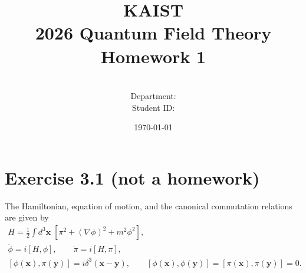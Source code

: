 \documentclass[a4paper,11pt]{article}
\title{KAIST\\2026 Quantum Field Theory\\
Homework 1\bigskip}
\author{\textbf{\Large \name} \\
Department: \department\\
Student ID: \studentid}
\date{\today}
\begin{document}
\thispagestyle{empty}
\maketitle
\tableofcontents
{}
\setcounter{secnumdepth}{1}
\setcounter{tocdepth}{2}

\newcommand{\tr}{\operatorname{tr}}
\newcommand{\sgn}{\operatorname{sgn}}
\newcommand{\supp}{\operatorname{supp}}
\renewcommand{\Re}{\operatorname{Re}}
\renewcommand{\Im}{\operatorname{Im}}
\newcommand{\boltz}{k_{\mathrm{B}}}

\section{Exercise 3.1 (not a homework)}

The Hamiltonian, equation of motion, and the canonical commutation relations are given by
\begin{gather}
    H = \frac{1}{2}\int d^3\mathbf{x}\;\left[\pi^2 + (\nabla\phi)^2 + m^2\phi^2\right],\\
    \dot{\phi} = i[H, \phi], \qquad\dot{\pi}=i[H,\pi],\\
    [\phi(\mathbf{x}), \pi(\mathbf{y})] = i\delta^3(\mathbf{x}-\mathbf{y}), \qquad [\phi(\mathbf{x}), \phi(\mathbf{y})] = [\pi(\mathbf{x}), \pi(\mathbf{y})] = 0.
\end{gather}
\end{document}
